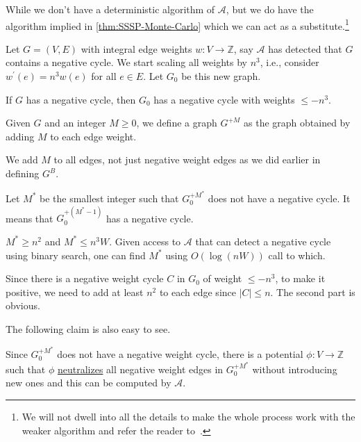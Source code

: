 \begin{intuition}
	While we don't have a deterministic algorithm of \(\mathcal{A} \), but we do have the algorithm implied in \autoref{thm:SSSP-Monte-Carlo} which we can act as a substitute.\footnote{We will not dwell into all the details to make the whole process work with the weaker algorithm and refer the reader to~\cite{bernstein2022negative,bringmann2023negative}.}
\end{intuition}

Let \(G = (V, E)\) with integral edge weights \(w \colon V \to \mathbb{Z} \), say \(\mathcal{A} \) has detected that \(G\) contains a negative cycle. We start scaling all weights by \(n^3\), i.e., consider \(w^{\prime} (e) = n^3 w(e)\) for all \(e \in E\). Let \(G_0\) be this new graph.

\begin{note}
	If \(G\) has a negative cycle, then \(G_0\) has a negative cycle with weights \(\leq -n^3\).
\end{note}

Given \(G\) and an integer \(M \geq 0\), we define a graph \(G^{+M}\) as the graph obtained by adding \(M\) to each edge weight.

\begin{note}
	We add \(M\) to all edges, not just negative weight edges as we did earlier in defining \(G^B\).
\end{note}

Let \(M^{\ast} \) be the smallest integer such that \(G_0^{+M^{\ast} }\) does not have a negative cycle. It means that \(G_0^{+(M^{\ast} -1)}\) has a negative cycle.

\begin{claim}
	\(M^{\ast} \geq n^2\) and \(M^{\ast} \leq n^3 W\). Given access to \(\mathcal{A} \) that can detect a negative cycle using binary search, one can find \(M^{\ast} \) using \(O(\log (nW))\) call to which.
\end{claim}
\begin{explanation}
	Since there is a negative weight cycle \(C\) in \(G_0\) of weight \(\leq -n^3\), to make it positive, we need to add at least \(n^2\) to each edge since \(\lvert C \rvert \leq n\). The second part is obvious.
\end{explanation}

The following claim is also easy to see.

\begin{claim}
	Since \(G_0^{+M^{\ast} }\) does not have a negative weight cycle, there is a potential \(\phi \colon V \to \mathbb{Z} \) such that \(\phi \) \hyperref[def:neutralize]{neutralizes} all negative weight edges in \(G_0^{+M^{\ast} }\) without introducing new ones and this can be computed by \(\mathcal{A} \).
\end{claim}


